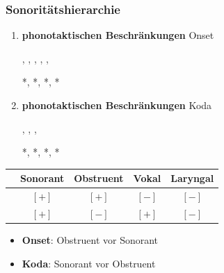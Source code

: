 \begin{frame}
\frametitle{Sonoritätshierarchie}

\begin{enumerate}
	\item \textbf{phonotaktischen Beschränkungen} \ras Onset
	
          \ea
          , \textipa{[pla:n]}, \textipa{[f\textscr E\c{c}]},
          \textipa{[flo:]}, \textipa{[kni:]}, \textipa{[gna:d@]}
          \z

          \ea
          *\textipa{[lbat]}, *\textipa{[\textscr to:k]}, *\textipa{[nki:l]}, *\textipa{[ngak]}
          \z

	\item \textbf{phonotaktischen Beschränkungen} \ras Koda

          \ea
          \textipa{[kalt]}, \textipa{[ha5t]}, \textipa{[lant]}, 
          \z

          \ea
          *\textipa{[katl]}, *, *\textipa{[latn]}, *
          \z

\end{enumerate}
	

\begin{table}
\centering
\begin{tabular}{c|c|c|c|c} 
 & Sonorant & Obstruent & Vokal & Laryngal \\ 
\hline 
[kon] & $[+]$ & $[+]$ & $[-]$ & $[-]$ \\ 
\hline 
[son] & $[+]$ & $[-]$ & $[+]$ & $[-]$
\end{tabular} 

\end{table}

\begin{itemize}
	\item \textbf{Onset}: Obstruent vor Sonorant
	\item \textbf{Koda}: Sonorant vor Obstruent
\end{itemize}

\end{frame}




